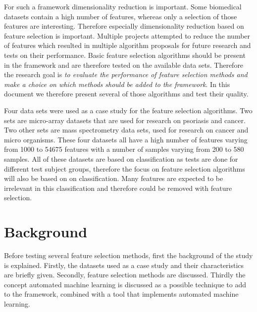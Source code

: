 	For such a framework dimensionality reduction is important. Some biomedical datasets contain a high number of features, whereas only a selection of those features are interesting. Therefore especially dimensionality reduction based on feature selection is important. Multiple projects attempted to reduce the number of features\cite{baumgartner2006data, welthagen2005comprehensive} which resulted in multiple algorithm proposals for future research\cite{lim2003planar, peng2010novel, biesiada2007feature, ding2005minimum} and tests on their performance\cite{catal2009investigating, liu2002comparative}. Basic feature selection algorithms should be present in the framework and are therefore tested on the available data sets. Therefore the research goal is \emph{to evaluate the performance of feature selection methods and make a choice on which methods should be added to the framework}. In this document we therefore present several of those algorithms and test their quality.
	
	Four data sets were used as a case study for the feature selection algorithms. Two sets are micro-array datasets that are used for research on psoriasis\cite{nair2009genome, suarez2012expanding, bigler2013cross, yao2008type} and cancer\cite{wojnarski2010rsctc}. Two other sets are mass spectrometry data sets, used for research on cancer\cite{NIPS2004_2728} and micro organisms\cite{doi:10.1093/bioinformatics/btu022}. These four datasets all have a high number of features varying from 1000 to 54675 features with a number of samples varying from 200 to 580 samples. All of these datasets are based on classification as tests are done for different test subject groups, therefore the focus on feature selection algorithms will also be based on on classification. Many features are expected to be irrelevant in this classification and therefore could be removed with feature selection.	
	
	\newpage
	\section{Background}
	\label{sec:Background}
	
	Before testing several feature selection methods, first the background of the study is explained. Firstly, the datasets used as a case study and their characteristics are briefly given. Secondly, feature selection methods are discussed. Thirdly the concept automated machine learning is discussed as a possible technique to add to the framework, combined with a tool that implements automated machine learning.
	
